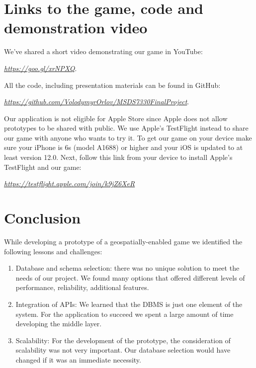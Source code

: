 \documentclass[conference]{IEEEtran}
\begin{document}
\section*{Links to the game, code  and demonstration video}

We've shared a short video demonstrating our game in YouTube:

\begin{center}
\textit{\small{\url{https://goo.gl/xrNPXQ}}}. 
\end{center}

All the code, including presentation materials can be found in GitHub:

\begin{center}
\textit{\small{\url{https://github.com/VolodymyrOrlov/MSDS7330FinalProject}}}. 
\end{center}

Our application is not eligible for Apple Store since Apple does not allow prototypes to be shared with public. We use Apple’s TestFlight instead to share our game with anyone who wants to try it. To get our game on your device make sure your iPhone is 6s (model A1688) or higher and your iOS is updated to at least version 12.0.  Next, follow this link from your device to install Apple's TestFlight and our game: 

\begin{center}
\textit{\small{\url{https://testflight.apple.com/join/k9jZ6XeR}}}
\end{center}

\section{Conclusion}

While developing a prototype of a geospatially-enabled game we identified the following lessons and challenges:

\begin{enumerate}
\item Database and schema selection: there was no unique solution to meet the needs of our project. We found many options that offered different levels of performance, reliability, additional features.
\item Integration of APIs: We learned that the DBMS is just one element of the system. For the application to succeed we spent a large amount of time developing the middle layer.
\item Scalability: For the development of the prototype, the consideration of scalability was not very important. Our database selection would have changed if it was an immediate necessity. 
\end{enumerate}
\end{document}
